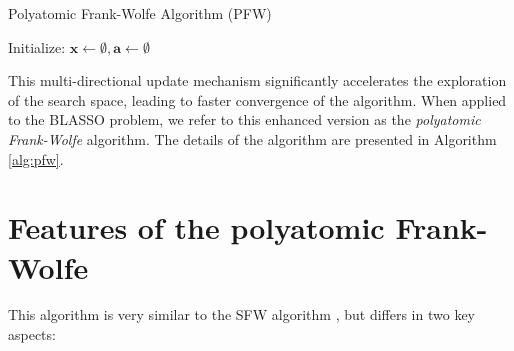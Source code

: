 \documentclass[a4paper,12pt,oneside]{report}
\theoremstyle{named}
\begin{document}
\begin{algorithm}
\DontPrintSemicolon
\caption{Polyatomic Frank-Wolfe Algorithm (PFW)}
\label{alg:pfw}
Initialize: $\mathbf{x} \gets \emptyset, \mathbf{a} \gets \emptyset$ \;
\end{algorithm}

This multi-directional update mechanism significantly accelerates the exploration of the search space, leading to faster convergence of the algorithm. When applied to the BLASSO problem, we refer to this enhanced version as the \textit{polyatomic Frank-Wolfe} algorithm. The details of the algorithm are presented in Algorithm \ref{alg:pfw}. 

\section{Features of the polyatomic Frank-Wolfe}

This algorithm is very similar to the SFW algorithm \cite{Denoyelle_2020}, but differs in two key aspects:
\end{document}
